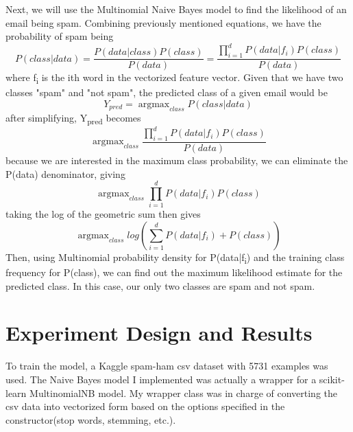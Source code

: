 \documentclass{article}
\DeclareMathOperator*{\argmax}{argmax}
\begin{document}
\begin{paragraph}
Next, we will use the Multinomial Naive Bayes model to find the likelihood of an email being spam. Combining previously mentioned equations, we have the probability of spam being
\begin{equation}
    P(class|data)=\frac{P(data|class)P(class)}{P(data)} = \frac{\prod_{i=1}^{d} P(data|f_i)P(class)}{P(data)}
\end{equation}
where f\textsubscript{i} is the ith word in the vectorized feature vector. Given that we have two classes "spam" and "not spam", the predicted class of a given email would be
\begin{equation}
    Y_{pred} = \argmax_{class} P(class|data)
\end{equation}
after simplifying, Y\textsubscript{pred} becomes
\begin{equation}
    \argmax_{class} \frac{\prod_{i=1}^{d}P(data|f_i)P(class)}{P(data)}
\end{equation}
because we are interested in the maximum class probability, we can eliminate the P(data) denominator, giving
\begin{equation}
    \argmax_{class} \prod_{i=1}^{d}P(data|f_i)P(class)
\end{equation}
taking the log of the geometric sum then gives
\begin{equation}
    \argmax_{class}  log(\sum_{i=1}^{d}P(data|f_i) + P(class))
\end{equation}
Then, using Multinomial probability density for P(data|f\textsubscript{i}) and the training class frequency for P(class), we can find out the maximum likelihood estimate for the predicted class. In this case, our only two classes are spam and not spam.
\end{paragraph}

\section{Experiment Design and Results}
\begin{paragraph}
To train the model, a Kaggle spam-ham csv dataset with 5731 examples was used. The Naive Bayes model I implemented was actually a wrapper for a scikit-learn MultinomialNB model. My wrapper class was in charge of converting the csv data into vectorized form based on the options specified in the constructor(stop words, stemming, etc.).
\end{paragraph}
\end{document}
